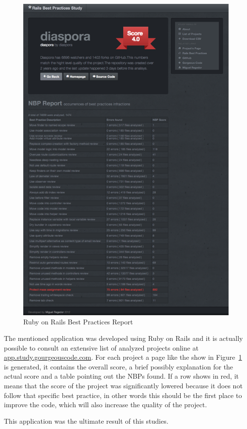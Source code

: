 \begin{figure}[h!]
  \caption{Ruby on Rails Best Practices Report}\label{fig:rbp_s}
  \centering
  \includegraphics[scale=0.75]{Images/rbp_s}
\end{figure}

The mentioned application was developed using Ruby on Rails and it is actually possible to consult an extensive list of analyzed projects online at \url{app.study.gourgeouscode.com}. For each project a page like the show in Figure~\ref{fig:rbp_s} is generated, 
it contains the overall score, a brief possibly explanation for the actual score and a table pointing out the 
NBPs found. If a row shows in red, it means that the score of the project was significantly lowered because 
it does not follow that specific best practice, in other words this should be the first place to improve the code,
which will also increase the quality of the project.

This application was the ultimate result of this studies.












